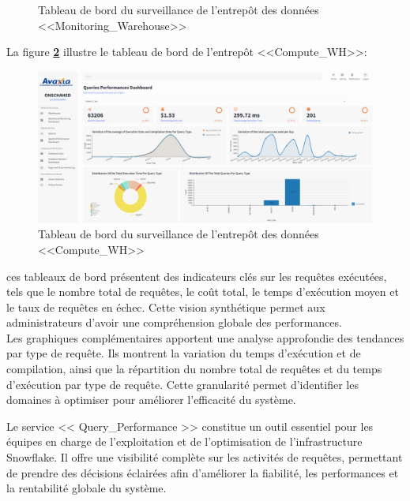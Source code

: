 \begin{itemize}
\begin{enumerate}
\begin{figure}[H]
                        \caption{Tableau de bord du surveillance de l'entrepôt des données <<Monitoring\_Warehouse>> }
                            \label{fig:queriesdash1}
                    \end{figure}
                    \par La figure \textbf{\ref{fig:queriesdash2}} illustre le tableau de bord de l'entrepôt <<Compute\_WH>>:
                    \begin{figure}[H]
                        \centering
                        \includegraphics[width =1\linewidth]{img/captures/queries/compute_dash.png}
                        \caption{Tableau de bord du surveillance de l'entrepôt des données <<Compute\_WH>>}
                            \label{fig:queriesdash2}
                    \end{figure}
                    \par ces tableaux de bord présentent des indicateurs clés sur les requêtes exécutées, tels que le nombre total de requêtes, le coût total, le temps d'exécution moyen et le taux de requêtes en échec. Cette vision synthétique permet aux administrateurs d'avoir une compréhension globale des performances.
                    \\ Les graphiques complémentaires apportent une analyse approfondie des tendances par type de requête. Ils montrent la variation du temps d'exécution et de compilation, ainsi que la répartition du nombre total de requêtes et du temps d'exécution par type de requête. Cette granularité permet d'identifier les domaines à optimiser pour améliorer l'efficacité du système.
            \end{enumerate}

\end{itemize}
\par Le service  << Query\_Performance >> constitue un outil essentiel pour les équipes en charge de l'exploitation et 
de l'optimisation de l'infrastructure Snowflake. Il offre une visibilité complète sur les activités de requêtes, 
permettant de prendre des décisions éclairées afin d'améliorer la fiabilité, les performances et la rentabilité globale du système.
